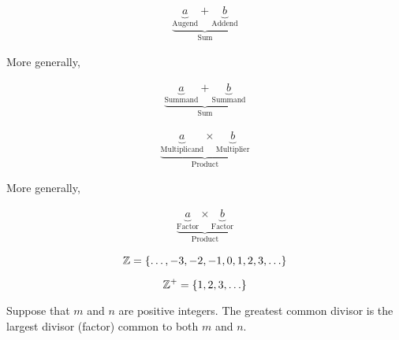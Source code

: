 \documentclass[20150903-160354-rs2.2-MarksMathNotebook.tex]{subfiles}
\begin{document}
\begin{definition}
\begin{align}
\underbrace{\underbrace{a}_{\text{Augend}}+\underbrace{b}_{\text{Addend}}}_{\text{Sum}} \label{eq:ooa}
\end{align}

More generally,


\begin{align}
\underbrace{\underbrace{a}_{\text{Summand}}+\underbrace{b}_{\text{Summand}}}_{\text{Sum}} \label{eq:ooag}
\end{align}
\end{definition}

\begin{definition} 
\begin{align}
\underbrace{\underbrace{a}_{\text{Multiplicand}} \times \underbrace{b}_{\text{Multiplier}}}_{\text{Product}} \label{eq:oom}
\end{align}

More generally,

\begin{align}
\underbrace{\underbrace{a}_{\text{Factor}} \times \underbrace{b}_{\text{Factor}}}_{\text{Product}} \label{eq:oomg}
\end{align}

\end{definition}



\begin{definition}[Integers]

\[
\mathbb{Z}=\left\{\ldots, -3, -2, -1, 0, 1, 2, 3, \ldots\right\}
\]

\end{definition}

\begin{definition}

\[
\mathbb{Z}^{+}=\left\{1, 2, 3, \ldots\right\}
\]
\end{definition}


\begin{definition}

Suppose that $m$ and $n$ are positive integers.  The greatest common divisor is the largest divisor (factor) common to both $m$ and $n$.

\end{definition}
\end{document}
